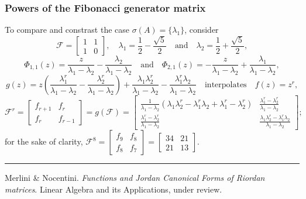 \documentclass[9pt]{beamer}
\begin{document}
\begin{frame}[fragile]
\frametitle{Powers of the Fibonacci generator matrix}
To compare and constrast the case $\sigma(A)=\lbrace \lambda_{1} \rbrace$, consider
\begin{displaymath}
\mathcal{F} = \left[\begin{matrix}1 & 1\\1 & 0\end{matrix}\right],
\quad  \lambda_{1} =  \frac{1}{2}- \frac{\sqrt{5}}{2}
\quad\text{and}\quad \lambda_{2} = \frac{1}{2} + \frac{\sqrt{5}}{2},
\end{displaymath}
\begin{displaymath}
\Phi_{ 1, 1 }{\left (z \right )} = \frac{z}{\lambda_{1} - \lambda_{2}} - \frac{\lambda_{2}}{\lambda_{1} - \lambda_{2}}
\quad\text{and}\quad \Phi_{ 2, 1 }{\left (z \right )} = - \frac{z}{\lambda_{1} - \lambda_{2}} + \frac{\lambda_{1}}{\lambda_{1} - \lambda_{2}},
\end{displaymath}
\begin{displaymath}
g{\left (z \right )} = z \left(\frac{\lambda_{1}^{r}}{\lambda_{1} - \lambda_{2}} - \frac{\lambda_{2}^{r}}{\lambda_{1} - \lambda_{2}}\right) + \frac{\lambda_{1} \lambda_{2}^{r}}{\lambda_{1} - \lambda_{2}} - \frac{\lambda_{1}^{r} \lambda_{2}}{\lambda_{1} - \lambda_{2}}\quad\text{interpolates}\quad f(z)=z^{r},
\end{displaymath}
\begin{displaymath}
\mathcal{F}^{r} = \left[\begin{matrix}f_{r+1} & f_{r}\\f_{r} & f_{r-1}\end{matrix}\right] =g(\mathcal{F})=\left[\begin{matrix}\frac{1}{\lambda_{1} - \lambda_{2}} \left(\lambda_{1} \lambda_{2}^{r} - \lambda_{1}^{r} \lambda_{2} + \lambda_{1}^{r} - \lambda_{2}^{r}\right) & \frac{\lambda_{1}^{r} - \lambda_{2}^{r}}{\lambda_{1} - \lambda_{2}}\\\frac{\lambda_{1}^{r} - \lambda_{2}^{r}}{\lambda_{1} - \lambda_{2}} & \frac{\lambda_{1} \lambda_{2}^{r} - \lambda_{1}^{r} \lambda_{2}}{\lambda_{1} - \lambda_{2}}\end{matrix}\right];
\end{displaymath}
for the sake of clarity,
$\displaystyle\mathcal{F}^{8} = \left[\begin{matrix}f_{9} & f_{8}\\f_{8} & f_{7}\end{matrix}\right] = \left[\begin{matrix}34 & 21\\21 & 13\end{matrix}\right].$
\vfill
\noindent\rule{\textwidth}{0.1pt}
{\footnotesize
Merlini \& Nocentini. \textit{Functions and Jordan Canonical Forms of Riordan
matrices}. \newline Linear Algebra and its Applications, under review.}
\end{frame}
\end{document}
